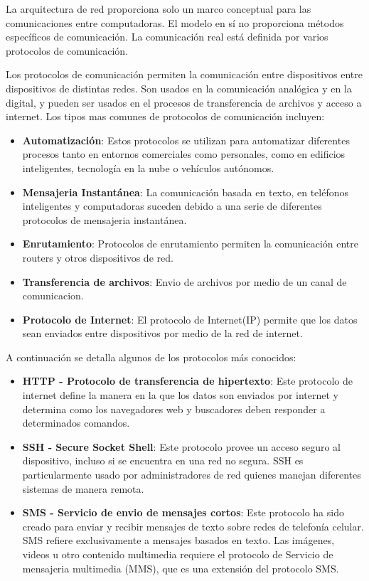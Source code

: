 La arquitectura de red proporciona solo un marco conceptual para las comunicaciones entre computadoras. El modelo en sí no proporciona métodos específicos de comunicación. La comunicación real está definida por varios protocolos de comunicación.

Los protocolos de comunicación permiten la comunicación entre dispositivos entre dispositivos de distintas redes. Son usados en la comunicación analógica y en la digital, y pueden ser usados en el procesos de transferencia de archivos y acceso a internet. Los tipos mas comunes de protocolos de comunicación incluyen:

\begin{itemize}
    \item \textbf{Automatización}: Estos protocolos se utilizan para automatizar diferentes procesos tanto en entornos comerciales como personales, como en edificios inteligentes, tecnología en la nube o vehículos autónomos.
    \item \textbf{Mensajeria Instantánea}: La comunicación basada en texto, en teléfonos inteligentes y computadoras suceden debido a una serie de diferentes protocolos de mensajeria instantánea.
    \item \textbf{Enrutamiento}: Protocolos de enrutamiento permiten la comunicación entre routers y otros dispositivos de red.
    \item \textbf{Transferencia de archivos}: Envio de archivos por medio de un canal de comunicacion.
    \item \textbf{Protocolo de Internet}: El protocolo de Internet(IP) permite que los datos sean enviados entre dispositivos por medio de la red de internet.
\end{itemize}

A continuación se detalla algunos de los protocolos más conocidos:
\begin{itemize}
    \item \textbf{HTTP - Protocolo de transferencia de hipertexto}: Este protocolo de internet define la manera en la que los datos son enviados por internet y determina como los navegadores web y buscadores deben responder a determinados comandos.
    \item \textbf{SSH - Secure Socket Shell}: Este protocolo provee un acceso seguro al dispositivo, incluso si se encuentra en una red no segura. SSH es particularmente usado por administradores de red quienes manejan diferentes sistemas de manera remota.
    \item \textbf{SMS - Servicio de envio de mensajes cortos}: Este protocolo ha sido creado para enviar y recibir mensajes de texto sobre redes de telefonía celular. SMS refiere exclusivamente a mensajes basados en texto. Las imágenes, videos u otro contenido multimedia requiere el protocolo de Servicio de mensajeria multimedia (MMS), que es una extensión del protocolo SMS.
\end{itemize}

